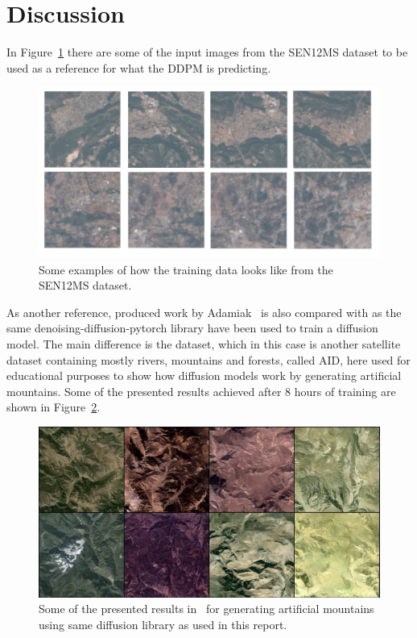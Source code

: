 \documentclass[fullpaper]{nldl}
\begin{document}
\section{Discussion}
\label{sect:Discussion}
In Figure~\ref{fig:real_grid} there are some of the input images from the SEN12MS dataset to be used as a reference for what the DDPM is predicting.
\begin{figure}[h!]
	\centering
	\includegraphics[width=1\linewidth]{real_grid_copy.png}
	\caption{Some examples of how the training data looks like from the SEN12MS dataset. \label{fig:real_grid}}
\end{figure}

As another reference, produced work by Adamiak~\cite{adamiak2023GenAI} is also compared with as the same denoising-diffusion-pytorch library have been used to train a diffusion model. The main difference is the dataset, which in this case is another satellite dataset containing mostly rivers, mountains and forests, called AID, here used for educational purposes to show how diffusion models work by generating artificial mountains. Some of the presented results achieved after 8 hours of training are shown in Figure~\ref{fig:ref_grid}.
\begin{figure}[h!]
	\centering
	\includegraphics[width=1\linewidth]{reference_grid.png}
	\caption{Some of the presented results in~\cite{adamiak2023GenAI} for generating artificial mountains using same diffusion library as used in this report. \label{fig:ref_grid}}
\end{figure}
\end{document}
